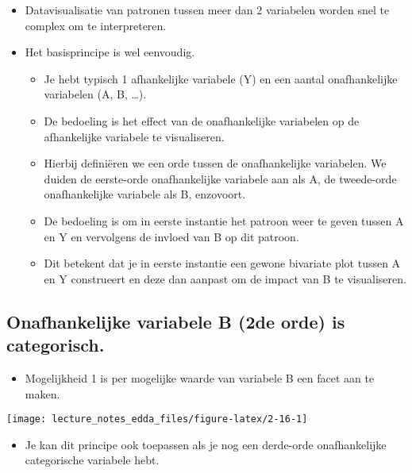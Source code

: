 \documentclass[]{memoir}
\providecommand{\tightlist}{%
  \setlength{\itemsep}{0pt}\setlength{\parskip}{0pt}}
\begin{document}
\begin{itemize}
\tightlist
\item
  Datavisualisatie van patronen tussen meer dan 2 variabelen worden snel te complex om te interpreteren.
\item
  Het basisprincipe is wel eenvoudig.

  \begin{itemize}
  \tightlist
  \item
    Je hebt typisch 1 afhankelijke variabele (Y) en een aantal onafhankelijke variabelen (A, B, \ldots{}).
  \item
    De bedoeling is het effect van de onafhankelijke variabelen op de afhankelijke variabele te visualiseren.
  \item
    Hierbij definiëren we een orde tussen de onafhankelijke variabelen. We duiden de eerste-orde onafhankelijke variabele aan als A, de tweede-orde onafhankelijke variabele als B, enzovoort.
  \item
    De bedoeling is om in eerste instantie het patroon weer te geven tussen A en Y en vervolgens de invloed van B op dit patroon.
  \item
    Dit betekent dat je in eerste instantie een gewone bivariate plot tussen A en Y construeert en deze dan aanpast om de impact van B te visualiseren.
  \end{itemize}
\end{itemize}

\hypertarget{onafhankelijke-variabele-b-2de-orde-is-categorisch.}{%
\subsection{Onafhankelijke variabele B (2de orde) is categorisch.}\label{onafhankelijke-variabele-b-2de-orde-is-categorisch.}}

\begin{itemize}
\tightlist
\item
  Mogelijkheid 1 is per mogelijke waarde van variabele B een facet aan te maken.
\end{itemize}

\texttt{[image: lecture\_notes\_edda\_files/figure-latex/2-16-1]}

\begin{itemize}
\tightlist
\item
  Je kan dit principe ook toepassen als je nog een derde-orde onafhankelijke categorische variabele hebt.
\end{itemize}
\end{document}
